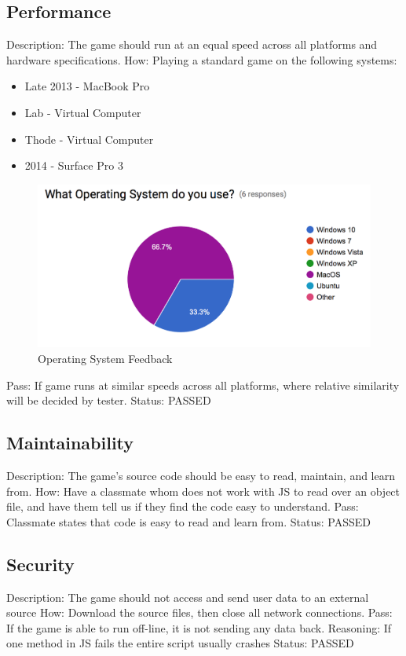 \documentclass{article}
\begin{document}
 \subsection{Performance}
 \label{sec:4.4}
Description: The game should run at an equal speed across all platforms and 
hardware specifications.  \newline
How: Playing a standard game on the following systems: 
\begin{itemize}
\item Late 2013 - MacBook Pro
\item Lab - Virtual Computer
\item Thode - Virtual Computer
\item 2014 - Surface Pro 3
\end{itemize}
\begin{figure}[H]
	\centering
	\includegraphics[width=\textwidth]{./Figures/10.png}
	\caption{Operating System Feedback}
\end{figure}
Pass: If game runs at similar speeds across all platforms, where relative 
similarity will be decided by tester.
\newline
Status: PASSED


 \subsection{Maintainability}
 \label{sec:4.5}
 Description: The game's source code should be easy to read, maintain, and 
 learn from. \newline
 How: Have a classmate whom does not work with JS to read over an object file, 
 and have them tell us if they find the code easy to understand. \newline
 Pass: Classmate states that code is easy to read and learn from.
 \newline Status: PASSED


 \subsection{Security}
 \label{sec:4.6}
Description: The game should not access and send user data to an external 
source \newline
How: Download the source files, then close all network connections.\newline
Pass: If the game is able to run off-line, it is not sending any data back.
Reasoning: If one method in JS fails the entire script usually crashes
\newline Status: PASSED
\end{document}
